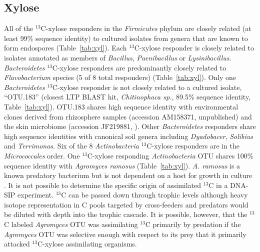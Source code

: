 \documentclass{article}
\begin{document}
\subsection{Xylose}
All of the $^{13}$C-xylose responders in the \textit{Firmicutes} phylum are
closely related (at least 99\% sequence identity) to cultured isolates from
genera that are known to form endospores (Table~\ref{tab:xyl}). Each
$^{13}$C-xylose responder is closely related to isolates annotated as members
of \textit{Bacillus}, \textit{Paenibacillus} or \textit{Lysinibacillus}.
\textit{Bacteroidetes} $^{13}$C-xylose responders are predominantly closely
related to \textit{Flavobacterium} species (5 of 8 total responders)
(Table~\ref{tab:xyl}).  Only one \textit{Bacteroidetes} $^{13}$C-xylose
responder is not closely related to a cultured isolate, ``OTU.183'' (closest
LTP BLAST hit, \textit{Chitinophaca sp.}, 89.5\% sequence identity,
Table~\ref{tab:xyl}). OTU.183 shares high sequence identity with environmental
clones derived from rhizosphere samples (accession AM158371, unpublished) and
the skin microbiome (accession JF219881, \citet{Kong_2012}). Other
\textit{Bacteroidetes} responders share high sequence identities with canonical
soil genera including \textit{Dyadobacer}, \textit{Solibius} and
\textit{Terrimonas}. Six of the 8 \textit{Actinobacteria} $^{13}$C-xylose
responders are in the \textit{Micrococcales} order. One $^{13}$C-xylose
responding \textit{Actinobacteria} OTU shares 100\% sequence identity with
\textit{Agromyces ramosus} (Table~\ref{tab:xyl}).  \textit{A. ramosus} is a
known predatory bacterium but is not dependent on a host for growth in culture
\citep{16346402}. It is not possible to determine the specific origin of
assimilated $^{13}$C in a DNA-SIP experiment. $^{13}$C can be passed down
through trophic levels although heavy isotope representation in C pools
targeted by cross-feeders and predators would be diluted with depth into the
trophic cascade. It is possible, however, that the $^{13}$C labeled
\textit{Agromyces} OTU was assimilating $^{13}$C primarily by predation if the
\textit{Agromyces} OTU was selective enough with respect to its prey that it
primarily attacked $^{13}$C-xylose assimilating organisms. 




\end{document}
